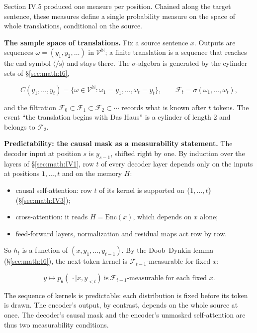 Section IV.5 produced one measure per position. Chained along the target
sentence, these measures define a single probability measure on the
space of whole translations, conditional on the source.

\textbf{The sample space of translations.} Fix a source sentence \(x\).
Outputs are sequences \(\omega = (y_{1}, y_{2}, \ldots)\) in
\(\mathcal{V}^{\mathbb{N}}\); a finite translation is a sequence
that reaches the end symbol \(\langle/\mathrm{s}\rangle\) and stays there. The \(\sigma\)-algebra is
generated by the cylinder sets of \S\ref{sec:math:I6},

\[
C(y_1,\dots,y_t) = \{\omega\in\mathcal V^{\mathbb N} : \omega_1 = y_1,\dots,\omega_t = y_t\}, \qquad \mathcal F_t = \sigma(\omega_1,\dots,\omega_t),
\]

and the filtration \(\mathcal{F}_{0} \subset \mathcal{F}_{1} \subset \mathcal{F}_{2} \subset \cdots\) records what is
known after \(t\) tokens. The event ``the translation begins with Das Haus''
is a cylinder of length 2 and belongs to \(\mathcal{F}_{2}\).

\textbf{Predictability: the causal mask as a measurability statement.}
The decoder input at position \(s\) is \(y_{s-1}\), shifted right by one. By
induction over the layers of \S\ref{sec:math:IV1}, row \(t\) of every decoder layer depends
only on the inputs at positions \(1, \ldots, t\) and on the memory \(H\):

\begin{itemize}
\tightlist
\item
  causal self-attention: row \(t\) of its kernel is supported on \(\{1,
  \ldots, t\}\) (\S\ref{sec:math:IV3});
\item
  cross-attention: it reads \(H = \mathrm{Enc}(x)\), which depends on \(x\) alone;
\item
  feed-forward layers, normalization and residual maps act row by row.
\end{itemize}

So \(h_t\) is a function of \((x, y_{1}, \ldots, y_{t-1})\). By the
Doob--Dynkin lemma (\S\ref{sec:math:I6}), the next-token kernel is \(\mathcal{F}_{t-1}\)-measurable
for fixed \(x\):

\[
y \mapsto p_\theta(\,\cdot\mid x, y_{<t}) \ \text{is}\ \mathcal F_{t-1}\text{-measurable for each fixed } x.
\]

The sequence of kernels is predictable: each distribution is fixed
before its token is drawn. The encoder's output, by contrast, depends on the whole source at once.
The decoder's causal mask and the encoder's unmasked self-attention are
thus two measurability conditions.

